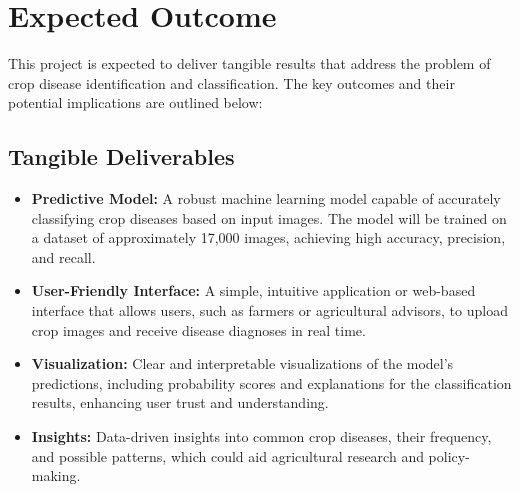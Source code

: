 \section{Expected Outcome}
This project is expected to deliver tangible results that address the problem of crop disease identification and classification. The key outcomes and their potential implications are outlined below:

\subsection{Tangible Deliverables}
\begin{itemize}
    \item \textbf{Predictive Model:} A robust machine learning model capable of accurately classifying crop diseases based on input images. The model will be trained on a dataset of approximately 17,000 images, achieving high accuracy, precision, and recall.
    \item \textbf{User-Friendly Interface:} A simple, intuitive application or web-based interface that allows users, such as farmers or agricultural advisors, to upload crop images and receive disease diagnoses in real time.
    \item \textbf{Visualization:} Clear and interpretable visualizations of the model's predictions, including probability scores and explanations for the classification results, enhancing user trust and understanding.
    \item \textbf{Insights:} Data-driven insights into common crop diseases, their frequency, and possible patterns, which could aid agricultural research and policy-making.
\end{itemize}

